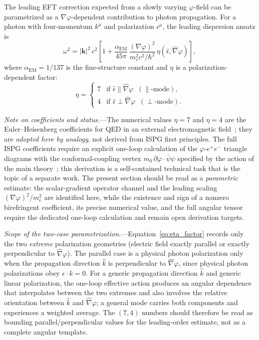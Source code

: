 \documentclass[aps,prd,onecolumn,superscriptaddress,nofootinbib,showpacs,12pt,notitlepage]{revtex4-2}
\begin{document}
The leading EFT correction expected from a slowly varying
$\varphi$-field can be parametrized as a
$\nabla\varphi$-dependent contribution to photon propagation.
For a photon with four-momentum $k^\mu$ and polarization
$\epsilon^\mu$, the leading dispersion ansatz is
\begin{equation}\label{eq:dispersion_biref}
  \omega^{2} = |\mathbf{k}|^{2}\,c^{2}\left[1
    + \frac{\alpha_{\mathrm{EM}}}{45\pi}\,
      \frac{(\nabla\varphi)^{2}}{m_e^{2}c^{2}/\hbar^{2}}\,
      \eta(\hat{\epsilon}, \hat{\nabla}\varphi)\right],
\end{equation}
where $\alpha_{\mathrm{EM}} = 1/137$ is the fine-structure
constant and $\eta$ is a polarization-dependent factor:
\begin{equation}\label{eq:eta_factor}
  \eta =
  \begin{cases}
    7 & \text{if } \hat{\epsilon} \parallel \hat{\nabla}\varphi
        \;\;(\parallel\text{-mode}),\\
    4 & \text{if } \hat{\epsilon} \perp \hat{\nabla}\varphi
        \;\;(\perp\text{-mode}).
  \end{cases}
\end{equation}

\textit{Note on coefficients and status.}---The numerical
values $\eta = 7$ and $\eta = 4$ are the Euler--Heisenberg
coefficients for QED in an external electromagnetic
field~\cite{EulerHeisenberg1936}; they are \emph{adopted here
by analogy}, not derived from ISPG first principles.  The full
ISPG coefficients require an explicit one-loop calculation of
the $\varphi$-$e^+e^-$ triangle diagrams with the
conformal-coupling vertex $m_0\,\partial\varphi\cdot\bar\psi\psi$
specified by the action of the main
theory~\cite{Lotishvili2026}; this derivation is a
self-contained technical task that is the topic of a separate
work.  The present section should be read as a
\emph{parametric} estimate: the scalar-gradient operator
channel and the leading scaling $(\nabla\varphi)^2/m_e^2$
are identified here, while the existence and sign of a
nonzero birefringent coefficient, its precise numerical value,
and the full angular tensor require the dedicated one-loop
calculation and remain open derivation targets.

\textit{Scope of the two-case parametrization.}---Equation~\eqref{eq:eta_factor}
records only the two \emph{extreme} polarization geometries
(electric field exactly parallel or exactly perpendicular to
$\hat{\nabla}\varphi$).  The parallel case is a physical
photon polarization only when the propagation direction
$\hat k$ is perpendicular to $\hat{\nabla}\varphi$, since
physical photon polarizations obey $\epsilon\cdot k=0$.
For a generic propagation direction
$\hat k$ and generic linear polarization, the one-loop effective
action produces an angular dependence that interpolates between
the two extremes and also involves the relative orientation
between $\hat k$ and $\hat{\nabla}\varphi$; a general mode carries
both components and experiences a weighted average.  The $(7,4)$
numbers should therefore be read as bounding parallel/perpendicular
values for the leading-order estimate, not as a complete angular
template.
\end{document}
